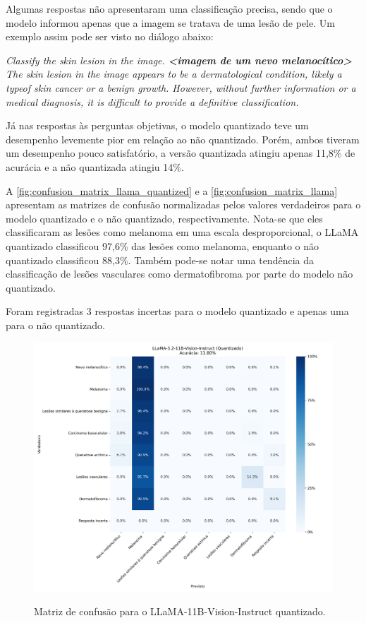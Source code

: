 Algumas respostas não apresentaram uma classificação precisa, sendo que o modelo informou apenas que a imagem se
tratava de uma lesão de pele. Um exemplo assim pode ser visto no diálogo abaixo:

\begin{dialogue}
     \textit{Classify the skin lesion in the image. \textbf{<imagem de um nevo melanocítico>}} \\
     \textit{The skin lesion in the image appears to be a dermatological condition, likely a typeof skin cancer or a benign growth. However, without
    further information or a medical diagnosis, it is difficult to provide a definitive classification.}
\end{dialogue}

Já nas respostas às perguntas objetivas, o modelo quantizado teve um desempenho levemente pior em relação ao não
quantizado. Porém, ambos tiveram um desempenho pouco satisfatório, a versão quantizada atingiu apenas 11,8\% de
acurácia e a não quantizada atingiu 14\%.

A \autoref{fig:confusion_matrix_llama_quantized} e a \autoref{fig:confusion_matrix_llama} apresentam as matrizes de
confusão normalizadas pelos valores verdadeiros para o modelo quantizado e o não quantizado, respectivamente. Nota-se
que eles classificaram as lesões como melanoma em uma escala desproporcional, o \ac{LLaMA} quantizado classificou
97,6\% das lesões como melanoma, enquanto o não quantizado classificou 88,3\%. Também pode-se notar uma tendência da
classificação de lesões vasculares como dermatofibroma por parte do modelo não quantizado.

Foram registradas 3 respostas incertas para o modelo quantizado e apenas uma para o não quantizado.

\begin{figure}[ht]
    \centering
    \caption{\small Matriz de confusão para o \ac{LLaMA}-11B-Vision-Instruct quantizado.}
    \includegraphics[width=1\columnwidth,keepaspectratio]{images/confusion_matrix_llama_3.2_11b_vision_instruct_quantized.png}
    \label{fig:confusion_matrix_llama_quantized}
\end{figure}

